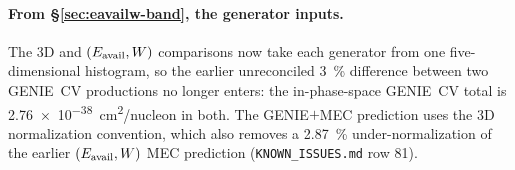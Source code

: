\paragraph{From \S\ref{sec:eavailw-band}, the generator inputs.} The 3D and $(E_{\mathrm{avail}},W)$ comparisons now take each generator from one five-dimensional histogram, so the earlier unreconciled \SI{3}{\percent} difference between two GENIE~CV productions no longer enters: the in-phase-space GENIE~CV total is \SI{2.76e-38}{cm^2/nucleon} in both. The GENIE$+$MEC prediction uses the 3D normalization convention, which also removes a \SI{2.87}{\percent} under-normalization of the earlier $(E_{\mathrm{avail}},W)$ MEC prediction (\texttt{KNOWN\_ISSUES.md} row 81).
